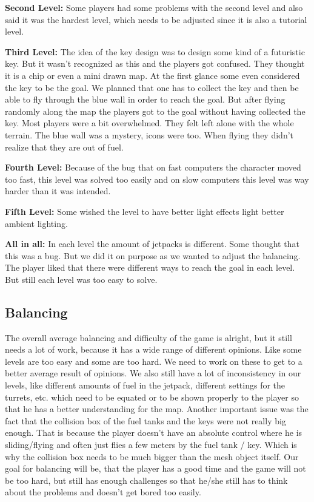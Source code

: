 \documentclass[12pt, letterpaper]{scrartcl}
\begin{document}
	 \textbf{Second Level:}
	 Some players had some problems with the second level and also said it was the hardest level, which needs to be adjusted since it is also a tutorial level.
	 
	 \textbf{Third Level:}
	 The idea of the key design was to design some kind of a futuristic key. But it wasn't recognized as this and the players got confused. They thought it is a chip or even a mini drawn map. At the first glance some even considered the key to be the goal.
	 We planned that one has to collect the key and then be able to fly through the blue wall in order to reach the goal. But after flying randomly along the map the players got to the goal without having collected the key.
	 Most players were a bit overwhelmed. They felt left alone with the whole terrain. The blue wall was a mystery, icons were too. When flying they didn't realize that they are out of fuel.
	 
	 \textbf{Fourth Level:}
	 Because of the bug that on fast computers the character moved too fast, this level was solved too easily and on slow computers this level was way harder than it was intended.
	 
	 \textbf{Fifth Level:}
	 Some wished the level to have better light effects light better ambient lighting.
	 
	 \textbf{All in all:}
	 In each level the amount of jetpacks is different. Some thought that this was a bug. But we did it on purpose as we wanted to adjust the balancing. The player liked that there were different ways to reach the goal in each level. But still each level was too easy to solve.
	 
	 \subsection{Balancing}
	 The overall average balancing and difficulty of the game is alright, but it still needs a lot of work, because it has a wide range of different opinions. Like some levels are too easy and some are too hard. We need to work on these to get to a better average result of opinions.
	 We also still have a lot of inconsistency in our levels, like different amounts of fuel in the jetpack, different settings for the turrets, etc. which need to be equated or to be shown properly to the player so that he has a better understanding for the map.
	 Another important issue was the fact that the collision box of the fuel tanks and the keys were not really big enough. That is because the player doesn't have an absolute control where he is sliding/flying and often just flies a few meters by the fuel tank / key. Which is why the collision box needs to be much bigger than the mesh object itself.
	 Our goal for balancing will be, that the player has a good time and the game will not be too hard, but still has enough challenges so that he/she still has to think about the problems and doesn't get bored too easily.
	 
\end{document}
